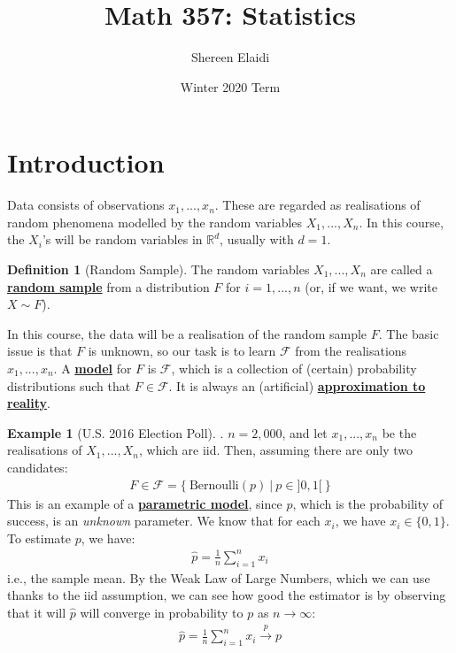 \documentclass[11pt]{scrartcl}
\title{\textbf{Math 357: Statistics}}
\author{Shereen Elaidi}
\date{Winter 2020 Term}
\newcommand{\R}[0]{\mathbb{R}}
\theoremstyle{definition}
\newtheorem{definition}{Definition}
\newtheorem{ex}{Example}
\theoremstyle{remark}
\newcommand{\dfn}[1]{\textbf{\underline{#1}}}
\newcommand{\dist}[0]{\mathcal{F}}
\newcommand{\cvp}[0]{\overset{p}{\to}}
\begin{document}
\maketitle
\tableofcontents




\section{Introduction}
Data consists of observations $x_1, ..., x_n$. These are regarded as realisations of random phenomena modelled by the random variables $X_1, ... , X_n$. In this course, the $X_i$'s will be random variables in $\R^d$, usually with $d=1$. 

\begin{definition}[Random Sample]
	The random variables $X_1, ..., X_n$ are called a \dfn{random sample} from a distribution $F$ for $i=1,...,n$ (or, if we want, we write $X \sim F$). 
\end{definition}

In this course, the data will be a realisation of the random sample $F$. The basic issue is that $F$ is unknown, so our task is to learn $\dist$ from the realisations $x_1, ..., x_n$. A \dfn{model} for $F$ is $\dist$, which is a collection of (certain) probability distributions such that $F \in \dist$. It is always an (artificial)  \dfn{approximation to reality}. 

\begin{ex}[U.S. 2016 Election Poll]. $n=2,000$, and let $x_1, ..., x_n$ be the realisations of $X_1, ..., X_n$, which are iid. Then, assuming there are only two candidates: 
\begin{align*}
	F \in \dist = \{\ \text{Bernoulli}(p)\ |\ p \in ]0,1[\ \} 	
\end{align*}
	This is an example of a \dfn{parametric model}, since $p$, which is the probability of success, is an \emph{unknown} parameter. We know that for each $x_i$, we have $x_i \in \{ 0, 1 \}$. To estimate $p$, we have:
	\begin{align*}
		\hat{p} = \frac{1}{n}	\sum_{i=1}^n x_i 
	\end{align*}
	i.e., the sample mean. By the Weak Law of Large Numbers, which we can use thanks to the iid assumption, we can see how good the estimator is by observing that it will $\hat{p}$ will converge in probability to $p$ as $n \rightarrow \infty$: 
	\begin{align}
		\hat{p} = \frac{1}{n} \sum_{i=1}^{n} x_i \cvp p 
	\end{align}
\end{ex}
\end{document}
